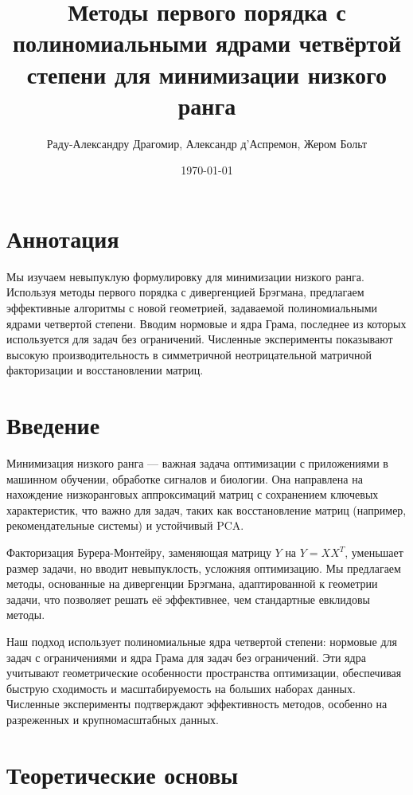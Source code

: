 \documentclass[a4paper,11pt]{article}
\title{Методы первого порядка с полиномиальными ядрами четвёртой степени для минимизации низкого ранга}
\author{Раду-Александру Драгомир, Александр д'Аспремон, Жером Больт}
\date{\today}
\begin{document}
\maketitle
\tableofcontents
\newpage

\section*{Аннотация}
Мы изучаем невыпуклую формулировку для минимизации низкого ранга. Используя методы первого порядка с дивергенцией Брэгмана, предлагаем эффективные алгоритмы с новой геометрией, задаваемой полиномиальными ядрами четвертой степени. Вводим нормовые и ядра Грама, последнее из которых используется для задач без ограничений. Численные эксперименты показывают высокую производительность в симметричной неотрицательной матричной факторизации и восстановлении матриц.

\section{Введение}
Минимизация низкого ранга — важная задача оптимизации с приложениями в машинном обучении, обработке сигналов и биологии. Она направлена на нахождение низкоранговых аппроксимаций матриц с сохранением ключевых характеристик, что важно для задач, таких как восстановление матриц (например, рекомендательные системы) и устойчивый PCA.

Факторизация Бурера-Монтейру, заменяющая матрицу \( Y \) на \( Y = XX^T \), уменьшает размер задачи, но вводит невыпуклость, усложняя оптимизацию. Мы предлагаем методы, основанные на дивергенции Брэгмана, адаптированной к геометрии задачи, что позволяет решать её эффективнее, чем стандартные евклидовы методы.

Наш подход использует полиномиальные ядра четвертой степени: нормовые для задач с ограничениями и ядра Грама для задач без ограничений. Эти ядра учитывают геометрические особенности пространства оптимизации, обеспечивая быструю сходимость и масштабируемость на больших наборах данных. Численные эксперименты подтверждают эффективность методов, особенно на разреженных и крупномасштабных данных.

\section{Теоретические основы}
\end{document}
